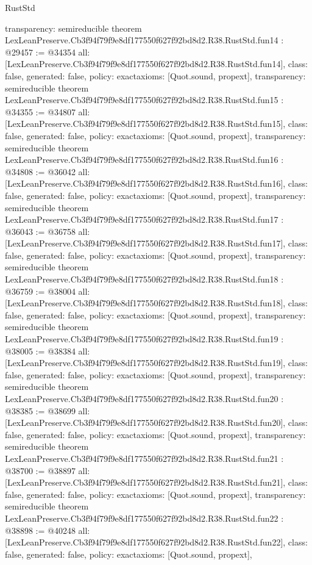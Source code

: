 \begin{lexlean}{RustStd}
\begin{coremodule}
{  transparency: semireducible
}
theorem LexLeanPreserve.Cb3f94f79f9e8df177550f627f92bd8d2.R38.RustStd.fun14 : @29457 := @34354 {
  all: [LexLeanPreserve.Cb3f94f79f9e8df177550f627f92bd8d2.R38.RustStd.fun14],
  class: false,
  generated: false,
  policy: exact{axioms: [Quot.sound, propext]},
  transparency: semireducible
}
theorem LexLeanPreserve.Cb3f94f79f9e8df177550f627f92bd8d2.R38.RustStd.fun15 : @34355 := @34807 {
  all: [LexLeanPreserve.Cb3f94f79f9e8df177550f627f92bd8d2.R38.RustStd.fun15],
  class: false,
  generated: false,
  policy: exact{axioms: [Quot.sound, propext]},
  transparency: semireducible
}
theorem LexLeanPreserve.Cb3f94f79f9e8df177550f627f92bd8d2.R38.RustStd.fun16 : @34808 := @36042 {
  all: [LexLeanPreserve.Cb3f94f79f9e8df177550f627f92bd8d2.R38.RustStd.fun16],
  class: false,
  generated: false,
  policy: exact{axioms: [Quot.sound, propext]},
  transparency: semireducible
}
theorem LexLeanPreserve.Cb3f94f79f9e8df177550f627f92bd8d2.R38.RustStd.fun17 : @36043 := @36758 {
  all: [LexLeanPreserve.Cb3f94f79f9e8df177550f627f92bd8d2.R38.RustStd.fun17],
  class: false,
  generated: false,
  policy: exact{axioms: [Quot.sound, propext]},
  transparency: semireducible
}
theorem LexLeanPreserve.Cb3f94f79f9e8df177550f627f92bd8d2.R38.RustStd.fun18 : @36759 := @38004 {
  all: [LexLeanPreserve.Cb3f94f79f9e8df177550f627f92bd8d2.R38.RustStd.fun18],
  class: false,
  generated: false,
  policy: exact{axioms: [Quot.sound, propext]},
  transparency: semireducible
}
theorem LexLeanPreserve.Cb3f94f79f9e8df177550f627f92bd8d2.R38.RustStd.fun19 : @38005 := @38384 {
  all: [LexLeanPreserve.Cb3f94f79f9e8df177550f627f92bd8d2.R38.RustStd.fun19],
  class: false,
  generated: false,
  policy: exact{axioms: [Quot.sound, propext]},
  transparency: semireducible
}
theorem LexLeanPreserve.Cb3f94f79f9e8df177550f627f92bd8d2.R38.RustStd.fun20 : @38385 := @38699 {
  all: [LexLeanPreserve.Cb3f94f79f9e8df177550f627f92bd8d2.R38.RustStd.fun20],
  class: false,
  generated: false,
  policy: exact{axioms: [Quot.sound, propext]},
  transparency: semireducible
}
theorem LexLeanPreserve.Cb3f94f79f9e8df177550f627f92bd8d2.R38.RustStd.fun21 : @38700 := @38897 {
  all: [LexLeanPreserve.Cb3f94f79f9e8df177550f627f92bd8d2.R38.RustStd.fun21],
  class: false,
  generated: false,
  policy: exact{axioms: [Quot.sound, propext]},
  transparency: semireducible
}
theorem LexLeanPreserve.Cb3f94f79f9e8df177550f627f92bd8d2.R38.RustStd.fun22 : @38898 := @40248 {
  all: [LexLeanPreserve.Cb3f94f79f9e8df177550f627f92bd8d2.R38.RustStd.fun22],
  class: false,
  generated: false,
  policy: exact{axioms: [Quot.sound, propext]},
}
\end{coremodule}
\end{lexlean}
